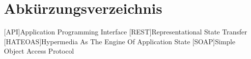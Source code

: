 \chapter{Abkürzungsverzeichnis}

\begin{acronym}
[API]{Application Programming Interface}
[REST]{Representational State Transfer}
[HATEOAS]{Hypermedia As The Engine Of Application State}
[SOAP]{Simple Object Access Protocol}
\end{acronym}